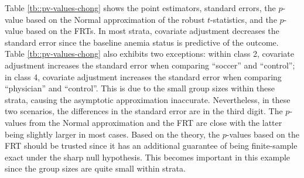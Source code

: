 Table \ref{tb::pv-values-chong} shows the point estimators, standard errors, the $p$-value based on the Normal approximation of the robust $t$-statistics, and the $p$-value based on the FRTs. In most strata, covariate adjustment decreases the standard error since the baseline anemia status is predictive of the outcome. Table \ref{tb::pv-values-chong} also exhibits two exceptions: within class 2, covariate adjustment increases the standard error when comparing ``soccer'' and ``control''; in class 4, covariate adjustment increases the standard error when comparing ``physician'' and ``control''. This is due to the small group sizes within these strata, causing the asymptotic approximation inaccurate. Nevertheless, in these two scenarios, the differences in the standard error are in the third digit.  The $p$-values from the Normal approximation and the FRT are close with the latter being slightly larger in most cases. Based on the theory, the $p$-values based on the FRT should be trusted since it has an additional guarantee of being finite-sample exact under the sharp null hypothesis. This becomes important in this example since the group sizes are quite small within strata. 

